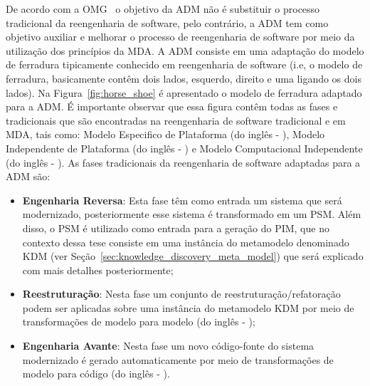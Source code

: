 De acordo com a OMG~\cite{OMG_OMG} o objetivo da ADM não é substituir o processo tradicional da reengenharia de software, pelo contrário, a ADM tem como objetivo auxiliar e melhorar o processo de reengenharia de software por meio da utilização dos princípios da MDA. A ADM consiste em uma adaptação do modelo de ferradura tipicamente conhecido em reengenharia de software (i.e, o modelo de ferradura, basicamente contêm dois lados, esquerdo, direito e uma  ligando os dois lados). Na Figura~\ref{fig:horse_shoe} é apresentado o modelo de ferradura adaptado para a ADM. É importante observar que essa figura contêm todas as fases e  tradicionais que são encontradas na reengenharia de software tradicional e em MDA, tais como: Modelo Especifico de Plataforma (do inglês - ), Modelo Independente de Plataforma (do inglês - ) e Modelo Computacional Independente (do inglês - ). As fases tradicionais da reengenharia de software adaptadas para a ADM são:


\begin{itemize}
 	\item \textbf{Engenharia Reversa}: Esta fase têm como entrada um sistema que será modernizado, posteriormente esse sistema é transformado em um PSM. Além disso, o PSM é utilizado como entrada para a geração do PIM, que no contexto dessa tese consiste em uma instância do metamodelo denominado KDM (ver Seção~\ref{sec:knowledge_discovery_meta_model}) que será explicado com mais detalhes posteriormente;
 	\item \textbf{Reestruturação}: Nesta fase um conjunto de reestruturação/refatoração podem ser aplicadas sobre uma instância do metamodelo KDM por meio de transformações de modelo para modelo (do inglês - );
 	\item \textbf{Engenharia Avante}: Nesta fase um novo código-fonte do sistema modernizado é gerado automaticamente por meio de transformações de modelo para código (do inglês - ). 
 \end{itemize} 

